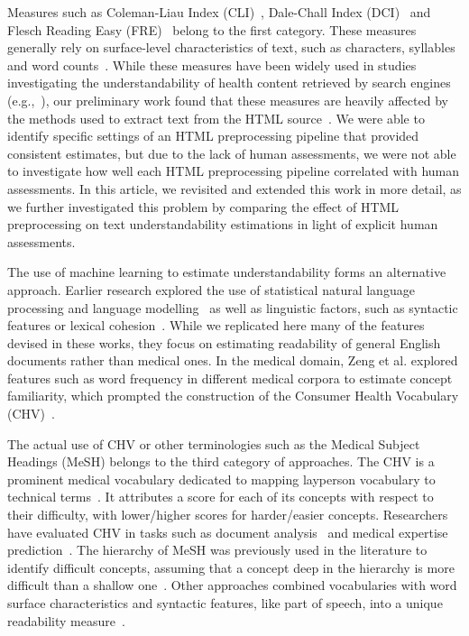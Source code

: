 \documentclass[10pt,a4paper]{article}
\begin{document}
Measures such as Coleman-Liau Index (CLI)~\cite{cli75}, Dale-Chall Index (DCI)~\cite{dale48} and Flesch Reading Easy (FRE)~\cite{flesch75}
belong to the first category. These measures generally rely on surface-level characteristics of text, such as characters, syllables and word counts~\cite{dubay04}. While these measures have been widely used in studies investigating the understandability of health content retrieved by search engines (e.g.,~\cite{graber99,fitzsimmons10,wiener13,patel13,meillier17,ellimoottil12,stossel12,becker04}), 
our preliminary work found that these measures are heavily affected by the methods used to extract text from the HTML source~\cite{palotti15}. We were able to identify specific settings of an HTML preprocessing pipeline that provided consistent estimates, but due to the lack of human assessments, we were not able to investigate how well each HTML preprocessing pipeline correlated with human assessments.
In this article, we revisited and extended this work in more detail, as we further investigated this problem by comparing the effect of HTML preprocessing on text understandability estimations in light of explicit human assessments. 

The use of machine learning to estimate understandability forms an alternative approach. Earlier research explored the use of statistical natural language processing and language modelling~\cite{liu04,collins05,heilman07} as well as linguistic factors, such as syntactic features or lexical cohesion~\cite{pitler08}. While we replicated here many of the features devised in these works, they focus on estimating readability of general English documents rather than medical ones. In the medical domain, Zeng et al. explored features such as word frequency in different medical corpora to estimate concept familiarity, which prompted the construction of the Consumer Health Vocabulary (CHV)~\cite{zeng05,zeng06,zeng08}.  

The actual use of CHV or other terminologies such as the Medical Subject Headings (MeSH) belongs to the third category of approaches. The CHV is a prominent medical vocabulary dedicated to mapping layperson vocabulary to technical terms~\cite{zeng06}. It attributes a score for each of its concepts with respect to their difficulty, with lower/higher scores for harder/easier concepts. Researchers have evaluated CHV in tasks such as document analysis~\cite{leroy08} and medical expertise prediction~\cite{palotti14}.
The hierarchy of MeSH was previously used in the literature to identify difficult concepts, assuming that a concept deep in the hierarchy is more difficult than a shallow one~\cite{yan11}. Other approaches combined vocabularies with word surface characteristics and syntactic features, like part of speech, into a unique readability measure~\cite{kim2007beyond}.
\end{document}
